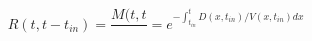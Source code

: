 \begin{equation}
R(t,t-t_{in}) = \frac{M(t,t}{} = e^{-\int_{t_{in}}^t D(x,t_{in})/V(x,t_{in}) dx}
\end{equation}